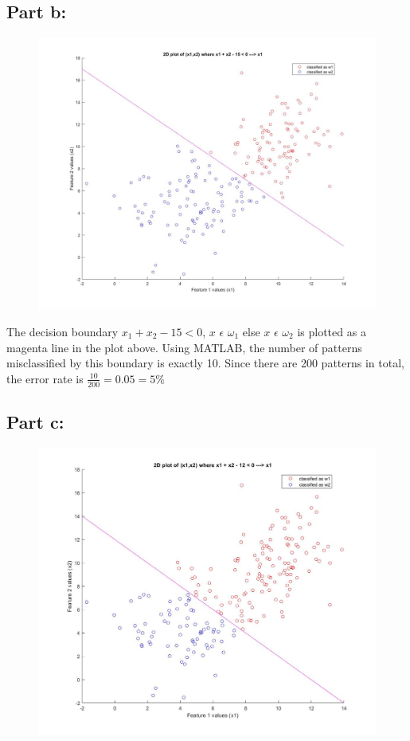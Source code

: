 \documentclass[a4paper,12pt]{article}
\begin{document}
\subsection*{Part b:}
\begin{figure}[H]
\centering
\includegraphics[scale=0.22]{q6pb.jpg}
\end{figure}

The decision boundary $x_1 + x_2 - 15 < 0$, $x$ $\epsilon$ $\omega_1$ else $x$ $\epsilon$ $\omega_2$ is plotted as a magenta line in the plot above. Using MATLAB, the number of patterns misclassified by this boundary is exactly 10. Since there are 200 patterns in total, the error rate is $\frac{10}{200} = 0.05 = 5 \%$

\subsection*{Part c:}
\begin{figure}[H]
\centering
\includegraphics[scale=0.23]{q6pc.jpg}
\end{figure}
\end{document}

